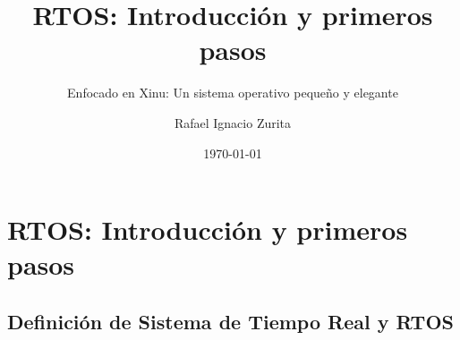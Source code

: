 \documentclass[8pt,aspectratio=169,compress]{beamer}
\title{RTOS: Introducción y primeros pasos}
\subtitle{Enfocado en Xinu: Un sistema operativo pequeño y elegante}
\author{Rafael Ignacio Zurita}
\institute{Depto. Ingeniería de Computadoras}
\date{\today}
\begin{document}
\begin{frame}
\bigskip
  \maketitle
\end{frame}




\section{RTOS: Introducción y primeros pasos}

\subsection{Definición de Sistema de Tiempo Real y RTOS}
\end{document}

